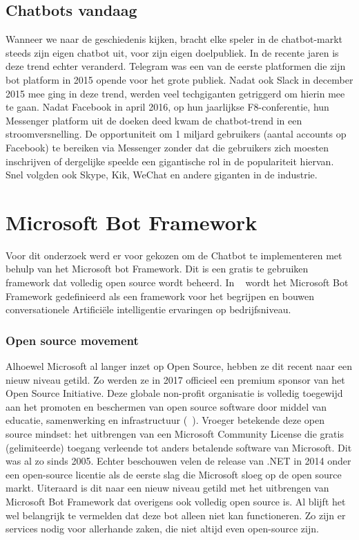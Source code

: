 \subsection{Chatbots vandaag}
Wanneer we naar de geschiedenis kijken, bracht elke speler in de chatbot-markt steeds zijn eigen chatbot uit, voor zijn eigen doelpubliek. In de recente jaren is deze trend echter veranderd. Telegram was een van de eerste platformen die zijn bot platform in 2015 opende voor het grote publiek. Nadat ook Slack in december 2015 mee ging in deze trend, werden veel techgiganten getriggerd om hierin mee te gaan. Nadat Facebook in april 2016, op hun jaarlijkse F8-conferentie, hun Messenger platform uit de doeken deed kwam de chatbot-trend in een stroomversnelling. De opportuniteit om 1 miljard  gebruikers (aantal accounts op Facebook) te bereiken  via Messenger zonder dat die gebruikers zich moesten inschrijven of dergelijke speelde een gigantische rol in de populariteit hiervan. Snel volgden ook Skype, Kik, WeChat en andere giganten in de industrie. 

\section{Microsoft Bot Framework}
Voor dit onderzoek werd er voor gekozen om de Chatbot te implementeren met behulp van het Microsoft bot Framework. Dit is een gratis te gebruiken framework dat volledig open source wordt beheerd.   
In ~\cite{Microsoft2019} wordt het Microsoft Bot Framework gedefinieerd als een framework voor het begrijpen en bouwen conversationele Artificiële intelligentie ervaringen op bedrijfsniveau. 

\subsubsection{Open source movement} 
Alhoewel Microsoft al langer inzet op Open Source, hebben ze dit recent naar een nieuw niveau getild. Zo werden ze in 2017 officieel een premium sponsor van het Open Source Initiative. Deze globale non-profit organisatie is volledig toegewijd aan het promoten en beschermen van open source software door middel van educatie, samenwerking en infrastructuur (~\cite{OSI2017}). 
Vroeger betekende deze open source mindset: het uitbrengen van een Microsoft Community License die gratis (gelimiteerde) toegang verleende tot anders betalende software van Microsoft. Dit was al zo sinds 2005. Echter beschouwen velen de release van .NET in 2014 onder een open-source licentie als de eerste slag die Microsoft sloeg op de open source markt. Uiteraard is dit naar een nieuw niveau getild met het uitbrengen van Microsoft Bot Framework dat overigens ook volledig open source is. Al blijft het wel belangrijk te vermelden dat deze bot alleen niet kan functioneren. Zo zijn er services nodig voor allerhande zaken, die niet altijd even open-source zijn. 

